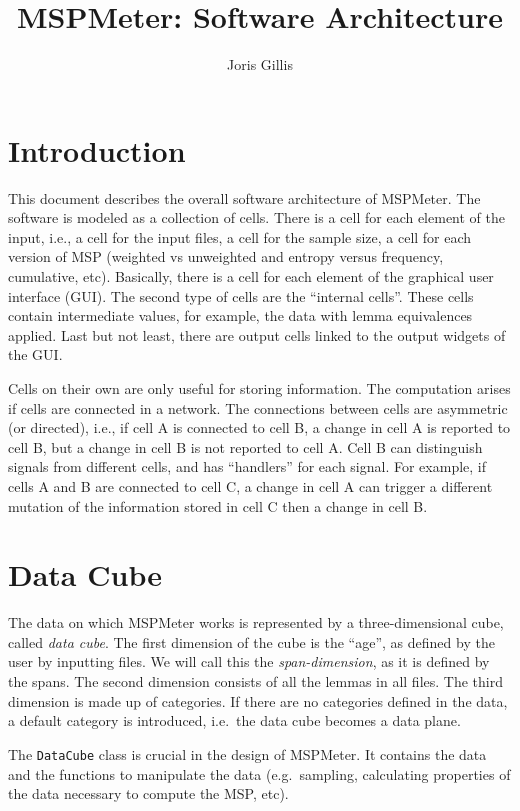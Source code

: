 \documentclass{article}
\title{MSPMeter: Software Architecture}
\author{Joris Gillis}
\begin{document}
\maketitle


\section{Introduction}

This document describes the overall software architecture of MSPMeter. The software is modeled as a collection of cells. There is a cell for each element of the input, i.e., a cell for the input files, a cell for the sample size, a cell for each version of MSP (weighted vs unweighted and entropy versus frequency, cumulative, etc). Basically, there is a cell for each element of the graphical user interface (GUI). The second type of cells are the ``internal cells''. These cells contain intermediate values, for example, the data with lemma equivalences applied. Last but not least, there are output cells linked to the output widgets of the GUI. 

Cells on their own are only useful for storing information. The computation arises if cells are connected in a network. The connections between cells are asymmetric (or directed), i.e., if cell A is connected to cell B, a change in cell A is reported to cell B, but a change in cell B is not reported to cell A. Cell B can distinguish signals from different cells, and has ``handlers'' for each signal. For example, if cells A and B are connected to cell C, a change in cell A can trigger a different mutation of the information stored in cell C then a change in cell B. 


\section{Data Cube}

The data on which MSPMeter works is represented by a three-dimensional cube, called \emph{data cube}.  The first dimension of the cube is the ``age'', as defined by the user by inputting files. We will call this the \emph{span-dimension}, as it is defined by the spans. The second dimension consists of all the lemmas in all files. The third dimension is made up of categories. If there are no categories defined in the data, a default category is introduced, i.e.\ the data cube becomes a data plane. 

The \texttt{DataCube} class is crucial in the design of MSPMeter. It contains the data and the functions to manipulate the data (e.g.\ sampling, calculating properties of the data necessary to compute the MSP, etc).
\end{document}
